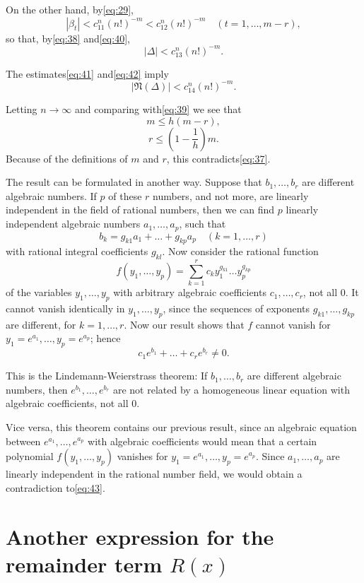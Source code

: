 On the other hand, by\eqref{eq:29},
\[ |\beta_t| < c_{11}^n (n!)^{-m} < c_{12}^n (n!)^{-m} \quad (t=1,\dots,m-r), \]
so that, by\eqref{eq:38} and\eqref{eq:40},
\begin{equation} |\Delta| < c_{13}^n (n!)^{-m}. \tag{42}\label{eq:42} \end{equation}

The estimates\eqref{eq:41} and\eqref{eq:42} imply
\[ |\mathfrak{N}(\Delta)| < c_{14}^n (n!)^{-m}. \]

Letting $n \to \infty$ and comparing with\eqref{eq:39} we see that
\[ m \leq h(m-r), \]
\[ r \leq \left(1-\frac{1}{h}\right)m. \]
Because of the definitions of $m$ and $r$, this contradicts\eqref{eq:37}.

The result can be formulated in another way. Suppose that $b_1, \dots, b_r$ are different algebraic numbers. If $p$ of these $r$ numbers, and not more, are linearly independent in the field of rational numbers, then we can find $p$ linearly independent algebraic numbers $a_1, \dots, a_p$, such that
\[ b_k = g_{k1}a_1 + \dots + g_{kp}a_p \quad (k=1,\dots,r) \]
with rational integral coefficients $g_{kl}$. Now consider the rational function
\[ f(y_1, \dots, y_p) = \sum_{k=1}^r c_k y_1^{g_{k1}} \dots y_p^{g_{kp}} \]
of the variables $y_1, \dots, y_p$ with arbitrary algebraic coefficients $c_1, \dots, c_r$, not all 0. It cannot vanish identically in $y_1, \dots, y_p$, since the sequences of exponents $g_{k1}, \dots, g_{kp}$ are different, for $k=1, \dots, r$. Now our result shows that $f$ cannot vanish for $y_1=e^{a_1}, \dots, y_p=e^{a_p}$; hence
\begin{equation} c_1 e^{b_1} + \dots + c_r e^{b_r} \neq 0. \tag{43}\label{eq:43} \end{equation}

This is the Lindemann-Weierstrass theorem: If $b_1, \dots, b_r$ are different algebraic numbers, then $e^{b_1}, \dots, e^{b_r}$ are not related by a homogeneous linear equation with algebraic coefficients, not all 0.

Vice versa, this theorem contains our previous result, since an algebraic equation between $e^{a_1}, \dots, e^{a_p}$ with algebraic coefficients would mean that a certain polynomial $f(y_1, \dots, y_p)$ vanishes for $y_1 = e^{a_1}, \dots, y_p = e^{a_p}$. Since $a_1, \dots, a_p$ are linearly independent in the rational number field, we would obtain a contradiction to\eqref{eq:43}.

\section{Another expression for the remainder term $R(x)$}

